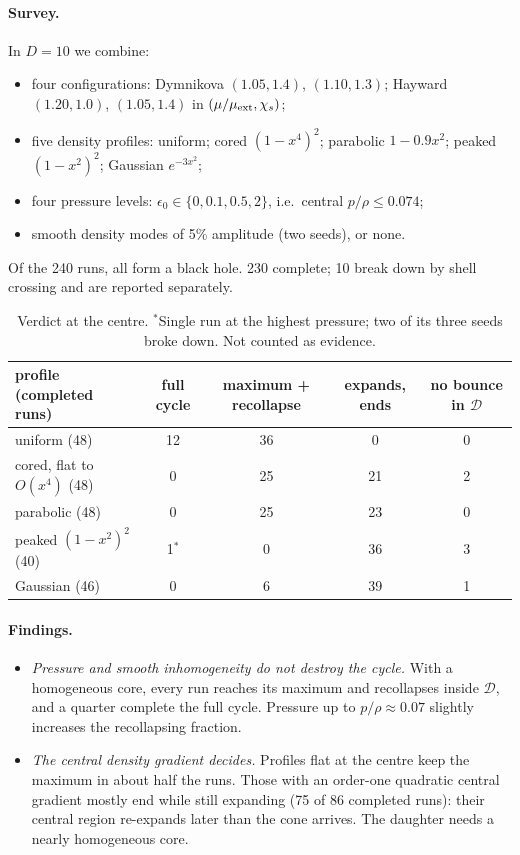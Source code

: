 \documentclass[11pt,a4paper]{article}
\theoremstyle{definition}\newtheorem{definition}[theorem]{Definition}
\theoremstyle{remark}\newtheorem{remark}[theorem]{Remark}
\begin{document}
\paragraph{Survey.} In $D=10$ we combine:
\begin{itemize}
\item four configurations: Dymnikova $(1.05,1.4)$, $(1.10,1.3)$; Hayward $(1.20,1.0)$, $(1.05,1.4)$ in $(\mu/\mu_{\rm ext},\chi_s)$;
\item five density profiles: uniform; cored $(1-x^4)^2$; parabolic $1-0.9x^2$; peaked $(1-x^2)^2$; Gaussian $e^{-3x^2}$;
\item four pressure levels: $\epsilon_0\in\{0,0.1,0.5,2\}$, i.e.\ central $p/\rho\le0.074$;
\item smooth density modes of 5\% amplitude (two seeds), or none.
\end{itemize}
Of the 240 runs, all form a black hole. 230 complete; 10 break down by shell crossing and are reported separately.
\begin{table}[h]\centering\small
\begin{tabular}{lcccc}\toprule
profile (completed runs) & full cycle & maximum + recollapse & expands, ends & no bounce in $\mathcal D$\\\midrule
uniform (48) & 12 & 36 & 0 & 0\\
cored, flat to $O(x^4)$ (48) & 0 & 25 & 21 & 2\\
parabolic (48) & 0 & 25 & 23 & 0\\
peaked $(1-x^2)^2$ (40) & 1$^*$ & 0 & 36 & 3\\
Gaussian (46) & 0 & 6 & 39 & 1\\\bottomrule
\end{tabular}
\caption{Verdict at the centre. $^*$Single run at the highest pressure; two of its three seeds broke down. Not counted as evidence.}
\end{table}

\paragraph{Findings.}
\begin{itemize}
\item \emph{Pressure and smooth inhomogeneity do not destroy the cycle.} With a homogeneous core, every run reaches its maximum and
recollapses inside $\mathcal D$, and a quarter complete the full cycle. Pressure up to $p/\rho\approx0.07$ slightly increases the
recollapsing fraction.
\item \emph{The central density gradient decides.} Profiles flat at the centre keep the maximum in about half the runs. Those with an
order-one quadratic central gradient mostly end while still expanding (75 of 86 completed runs): their central region re-expands later
than the cone arrives. The daughter needs a nearly homogeneous core.
\end{itemize}
\end{document}
